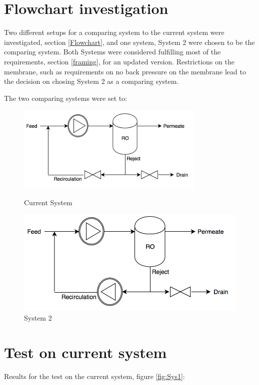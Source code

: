 

\section{Flowchart investigation}
Two different setups for a comparing system to the current system were investigated, section \ref{Flowchart}, and one system, System 2 were chosen to be the comparing system. Both Systems were considered fulfilling most of the requirements, section \ref{framing}, for an updated version. Restrictions on the membrane, such as requirements on no back pressure on the membrane lead to the decision on chosing System 2 as a comparing system. 

The two comparing systems were set to:\\
\begin{figure}[h]
\centering
\begin{minipage}{.5\textwidth}
    \centering
    \includegraphics[width=0.8\textwidth]{Sys1}
    \caption{Current System}
    \label{fig:System1}
\end{minipage}%
\begin{minipage}{.5\textwidth}
  \centering
  \includegraphics[width=.8\linewidth]{Sys2}
  \caption{System 2}
  \label{fig:System2}
\end{minipage}
\end{figure}

\section{Test on current system}
Results for the test on the current system, figure \ref{fig:Sys1}:


